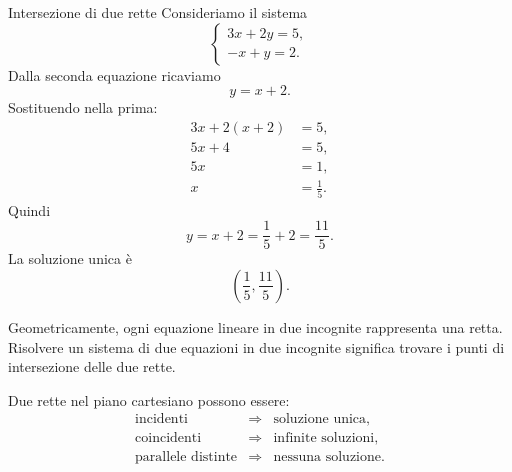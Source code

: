 \documentclass[a4paper]{article}
\begin{document}
\begin{snippetexample}{Intersezione di due rette}
    Consideriamo il sistema
    \[
        \begin{cases}
            3x+2y=5,\\
            -x+y=2.
        \end{cases}
    \]
    Dalla seconda equazione ricaviamo
    \[
        y=x+2.
    \]
    Sostituendo nella prima:
    \begin{align*}
        3x+2(x+2)&=5,\\
        5x+4&=5,\\
        5x&=1,\\
        x&=\frac{1}{5}.
    \end{align*}
    Quindi
    \[
        y=x+2=\frac{1}{5}+2=\frac{11}{5}.
    \]
    La soluzione unica è
    \[
        \left(\frac{1}{5},\frac{11}{5}\right).
    \]
\end{snippetexample}

Geometricamente, ogni equazione lineare in due incognite rappresenta una retta. Risolvere un sistema di due equazioni in due incognite significa trovare i punti di intersezione delle due rette.

Due rette nel piano cartesiano possono essere:
\[
    \begin{array}{rcl}
        \text{incidenti} &\Longrightarrow& \text{soluzione unica},\\
        \text{coincidenti} &\Longrightarrow& \text{infinite soluzioni},\\
        \text{parallele distinte} &\Longrightarrow& \text{nessuna soluzione}.
    \end{array}
\]

\begin{center}
\end{center}
\end{document}
